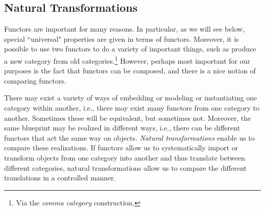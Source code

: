 \documentclass[11pt]{book}
\theoremstyle{definition}
\theoremstyle{definition}
\theoremstyle{definition}
\theoremstyle{theorem}
\theoremstyle{definition}
\begin{document}
\subsection{Natural Transformations}
Functors are important for many reasons. In particular, as we will see below, special ``universal" properties are given in terms of functors. Moreover, it is possible to use two functors to do a variety of important things, such as produce a new category from old categories.\footnote{Via the \textit{comma category} construction.} However, perhaps most important for our purposes is the fact that functors can be composed, and there is a nice notion of comparing functors.\par  
There may exist a variety of ways of embedding or modeling or instantiating one category within another, i.e., there may exist many functors from one category to another. Sometimes these will be equivalent, but sometimes not. Moreover, the same blueprint may be realized in different ways, i.e., there can be different functors that act the same way on objects. \textit{Natural transformations} enable us to compare these realizations. If functors allow us to systematically import or transform objects from one category into another and thus translate between different categories, natural transformations allow us to compare the different translations in a controlled manner.  
\end{document}
